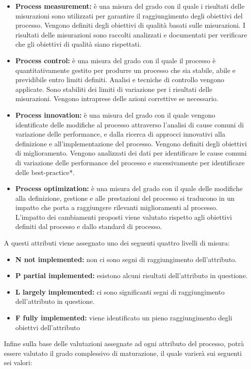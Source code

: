 \begin{itemize}
	\item \textbf{Process measurement:} è una misura del grado con il quale i risultati delle misurazioni sono utilizzati per garantire il raggiungimento degli obiettivi del processo. Vengono definiti degli obiettivi di qualità basati sulle misurazioni. I risultati delle misurazioni sono raccolti analizzati e documentati per verificare che gli obiettivi di qualità siano rispettati.
	\item \textbf{Process control:} è una misura del grado con il quale il processo è quantitativamente gestito per produrre un processo che sia stabile, abile e previdibile entro limiti definiti. Analisi e tecniche di controllo vengono applicate. Sono stabiliti dei limiti di variazione per i risultati delle misurazioni. Vengono intraprese delle azioni correttive se necessario. 
	\item \textbf{Process innovation:} è una misura del grado con il quale vengono identificate delle modifiche al processo attraverso l'analisi di cause comuni di variazione delle performance, e dalla ricerca di approcci innovativi alla definizione e all'implementazione del processo. Vengono definiti degli obiettivi di miglioramento. Vengono analizzati dei dati per identificare le cause comuni di variazione delle performance del processo e sucessivamente per identificare delle best-practice*.
	\item \textbf{Process optimization:} è una misura del grado con il quale delle modifiche alla definizione, gestione e alle prestazioni del processo si traducono in un impatto che porta a raggiungere rilevanti miglioramenti al processo. L'impatto dei cambiamenti proposti viene valutato rispetto agli obiettivi definiti dal processo e dallo standard di processo.
\end{itemize}
A questi attributi viene assegnato uno dei seguenti quattro livelli di misura:
\begin{itemize}
	\item \textbf{N not implemented:} non ci sono segni di raggiungimento dell'attributo.
	\item \textbf{P partial implemented:} esistono alcuni risultati dell'attributo in questione.
	\item \textbf{L largely implemented:} ci sono significanti segni di raggiungimento dell'attributo in questione.
	\item \textbf{F fully implemented:} viene identificato un pieno raggiungimento degli obiettvi dell'attributo
\end{itemize}
Infine sulla base delle valutazioni assegnate ad ogni attributo del processo, potrà essere valutato il grado complessivo di maturazione, il quale varierà sui seguenti sei valori:
